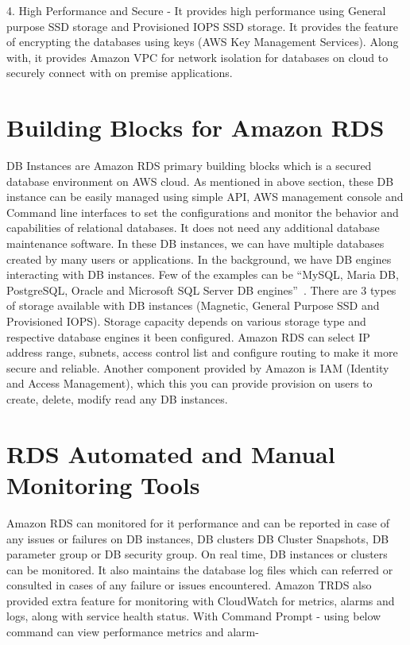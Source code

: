\begin{Abstract}
4. High Performance and Secure - It provides high performance using General 
purpose SSD storage and Provisioned IOPS SSD storage. It provides the feature 
of encrypting the databases using keys (AWS Key Management Services). 
Along with, it provides Amazon VPC for network isolation for databases on 
cloud to securely connect with on premise applications.
 

\section{Building Blocks for Amazon RDS}

DB Instances are Amazon RDS primary building blocks which is a secured database 
environment on AWS cloud. As mentioned in above section, these DB instance can 
be easily managed using simple API, AWS management console and Command line 
interfaces to set the configurations and monitor the behavior and capabilities 
of relational databases. It does not need any additional database maintenance 
software. In these DB instances, we can have multiple databases created by many 
users or 
applications.
In the background, we have DB engines interacting with DB instances. Few of the 
examples can be ``MySQL, Maria DB, PostgreSQL, Oracle and Microsoft SQL Server DB 
engines''~\cite{hid-sp18-520-amazonrds}.
There are 3 types of storage available with DB instances (Magnetic, General 
Purpose SSD and Provisioned IOPS).
Storage capacity depends on various storage type and respective database engines 
it been configured.
Amazon RDS can select IP address range, subnets, access control list and 
configure routing to make it more secure and reliable.
Another component provided by Amazon is IAM (Identity and Access Management), 
which this you can provide provision on users to create, delete, modify read 
any DB instances.

\section{RDS Automated and Manual Monitoring Tools}

Amazon RDS can monitored for it performance and can be reported in case of 
any issues or failures on DB instances, DB clusters DB Cluster Snapshots, DB 
parameter group or DB security group.
On real time, DB instances or clusters can be monitored. It also maintains the 
database log files which can referred or consulted in cases of any failure or 
issues encountered.
Amazon TRDS also provided extra feature for monitoring with CloudWatch for 
metrics, alarms and logs, along with service health status.
With Command Prompt - using below command can view performance metrics and 
alarm- 


\end{Abstract}
